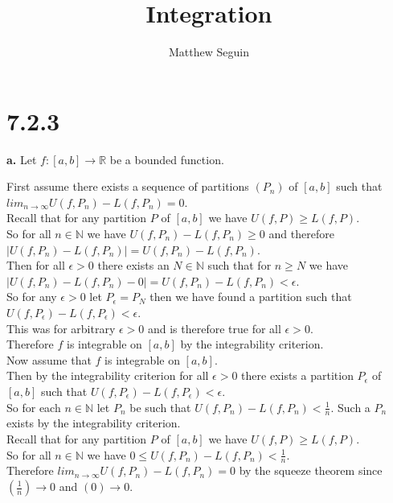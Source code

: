 \documentclass{article}
\title{Integration}
\author{Matthew Seguin}
\date{}
\begin{document}
\maketitle

\section*{7.2.3}

{\Large\textbf{a.}} Let $f: [a, b]\rightarrow\mathbb{R}$ be a bounded function.
\begin{center}
    \doublespacing
    First assume there exists a sequence of partitions $(P_n)$ of $[a, b]$ such that $lim_{n\rightarrow\infty} U(f, P_n) - L(f, P_n) = 0$.
    \\Recall that for any partition $P$ of $[a, b]$ we have $U(f, P)\geq L(f, P)$.
    \\So for all $n\in\mathbb{N}$ we have $U(f, P_n) - L(f, P_n)\geq 0$ and therefore $|U(f, P_n) - L(f, P_n)| = U(f, P_n) - L(f, P_n)$.
    \\Then for all $\epsilon > 0$ there exists an $N\in\mathbb{N}$ such that for $n\geq N$ we have $|U(f, P_n) - L(f, P_n) - 0| = U(f, P_n) - L(f, P_n) <\epsilon$.
    \\So for any $\epsilon > 0$ let $P_{\epsilon} = P_N$ then we have found a partition such that $U(f, P_{\epsilon}) - L(f, P_{\epsilon}) <\epsilon$.
    \\This was for arbitrary $\epsilon > 0$ and is therefore true for all $\epsilon > 0$.
    \\Therefore $f$ is integrable on $[a, b]$ by the integrability criterion.
    \break
    \\Now assume that $f$ is integrable on $[a, b]$.
    \\Then by the integrability criterion for all $\epsilon > 0$ there exists a partition $P_{\epsilon}$ of $[a, b]$ such that $U(f, P_{\epsilon}) - L(f, P_{\epsilon}) <\epsilon$.
    \\So for each $n\in\mathbb{N}$ let $P_n$ be such that $U(f, P_n) - L(f, P_n) <\frac{1}{n}$. Such a $P_n$ exists by the integrability criterion.
    \\Recall that for any partition $P$ of $[a, b]$ we have $U(f, P)\geq L(f, P)$.
    \\So for all $n\in\mathbb{N}$ we have $0\leq U(f, P_n) - L(f, P_n) <\frac{1}{n}$.
    \\Therefore $lim_{n\rightarrow\infty} U(f, P_n) - L(f, P_n) = 0$ by the squeeze theorem since $(\frac{1}{n})\rightarrow 0$ and $(0)\rightarrow 0$.

\end{center}
\end{document}
